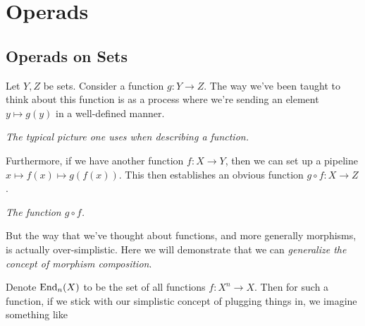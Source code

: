 \chapter{Operads}
\section{Operads on Sets}

Let $Y, Z$ be sets. Consider a function $g: Y \to Z$. The way we've been 
taught to think about this function is as a process where we're 
sending an element $y \mapsto g(y)$ 
in a well-defined manner. 
\begin{center}
    
    \emph{The typical picture one uses when describing a function.}
\end{center} 

Furthermore, if we have another function $f: X \to Y$, 
then we can set up a pipeline $x \mapsto f(x) \mapsto g(f(x))$. This then 
establishes an obvious function $g \circ f: X \to Z$. 
\begin{center}

    \emph{The function $g \circ f$.}
\end{center}

But the way that we've thought about functions, and more generally morphisms,
is actually over-simplistic. Here we will demonstrate that we can \emph{generalize 
the concept of morphism composition}.

Denote $\operatorname{\mathrm{End}}_n(X)$ to be the set of all functions 
$f:X^n \to X$. Then for such a function, if we stick with our simplistic concept of plugging things in, we 
imagine something like
\begin{center}
\end{center} 

